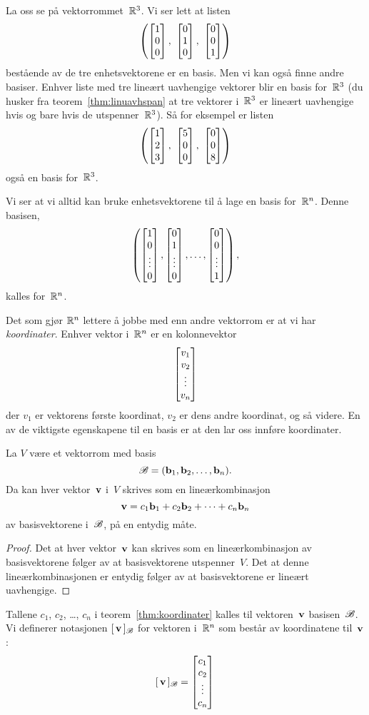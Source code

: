 \begin{ex}
La oss se på vektorrommet~$\mathbb{R}^3$.
Vi ser lett at listen
\[
\left(
\vvv{1}{0}{0},\ %
\vvv{0}{1}{0},\ %
\vvv{0}{0}{1}
\right)
\]
bestående av de tre enhetsvektorene er en basis.  Men vi kan også
finne andre basiser.  Enhver liste med tre lineært uavhengige vektorer
blir en basis for~$\mathbb{R}^3$ (du husker fra teorem~\ref{thm:linuavhspan}
at tre vektorer i~$\mathbb{R}^3$ er lineært uavhengige hvis og bare hvis de
utspenner~$\mathbb{R}^3$).  Så for eksempel er listen
\[
\left(
\vvv{1}{2}{3},\ %
\vvv{5}{0}{0},\ %
\vvv{0}{0}{8}
\right)
\]
også en basis for~$\mathbb{R}^3$.
\end{ex}

Vi ser at vi alltid kan bruke enhetsvektorene til å lage en basis
for~$\mathbb{R}^n$.  Denne basisen,
\[
\left(
\begin{bmatrix} 1 \\ 0 \\ \vdots \\ 0 \end{bmatrix},
\begin{bmatrix} 0 \\ 1 \\ \vdots \\ 0 \end{bmatrix},
\ldots,
\begin{bmatrix} 0 \\ 0 \\ \vdots \\ 1 \end{bmatrix}
\right),
\]
kalles  for~$\mathbb{R}^n$.

Det som gjør $\mathbb{R}^n$ lettere å jobbe med enn andre vektorrom er at vi
har \emph{koordinater}.  Enhver vektor i~$\mathbb{R}^n$ er en kolonnevektor
\[
\begin{bmatrix} v_1 \\ v_2 \\ \vdots \\ v_n \end{bmatrix}
\]
der $v_1$ er vektorens første koordinat, $v_2$ er dens andre
koordinat, og så videre.  En av de viktigste egenskapene til en basis
er at den lar oss innføre koordinater.

\begin{thm}
\label{thm:koordinater}
La $V$ være et vektorrom med basis
\[
\mathscr{B} = (\mathbf{b}_1, \mathbf{b}_2, \ldots, \mathbf{b}_n).
\]
Da kan hver vektor~$\mathbf{v}$ i~$V$ skrives som en lineærkombinasjon
\[
\mathbf{v} = c_1 \mathbf{b}_1 + c_2 \mathbf{b}_2 + \cdots + c_n \mathbf{b}_n
\]
av basisvektorene i~$\mathscr{B}$, på en entydig måte.
\end{thm}
\begin{proof}
Det at hver vektor~$\mathbf{v}$ kan skrives som en lineærkombinasjon av
basisvektorene følger av at basisvektorene utspenner~$V$.  Det at
denne lineærkombinasjonen er entydig følger av at basisvektorene er
lineært uavhengige.
\end{proof}

\begin{defn}
Tallene $c_1$, $c_2$, \ldots, $c_n$ i teorem~\ref{thm:koordinater}
kalles  til vektoren~$\mathbf{v}$  basisen~$\mathscr{B}$.  Vi definerer notasjonen $[\,{\mathbf{v}}\,]_{\mathscr{B}}$ for
vektoren i~$\mathbb{R}^n$ som består av koordinatene til~$\mathbf{v}$:
\[
[\,{\mathbf{v}}\,]_{\mathscr{B}} = \begin{bmatrix} c_1 \\ c_2 \\ \vdots \\ c_n \end{bmatrix}\qedhere
\]
\end{defn}

